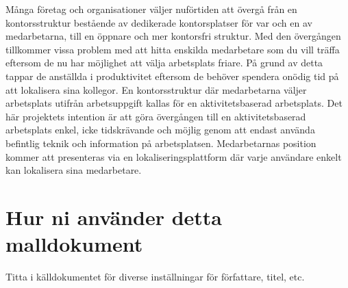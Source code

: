 \documentclass[swedish, a4paper,12pt]{article}
\begin{document}
\begin{sammanfattning}
%
%
Många företag och organisationer väljer nuförtiden att övergå från en kontorsstruktur bestående av dedikerade kontorsplatser för var och en av medarbetarna, till en öppnare och mer kontorsfri struktur. %
Med den övergången tillkommer vissa problem med att hitta enskilda medarbetare som du vill träffa eftersom de nu har möjlighet att välja arbetsplats friare. På grund av detta tappar de anställda i produktivitet eftersom de behöver spendera onödig tid på att lokalisera sina kollegor. En kontorsstruktur där medarbetarna väljer arbetsplats utifrån arbetsuppgift kallas för en aktivitetsbaserad arbetsplats. Det här projektets intention är att göra övergången till en aktivitetsbaserad arbetsplats enkel, icke tidskrävande och möjlig genom att endast använda befintlig teknik och information på arbetsplatsen. Medarbetarnas position kommer att presenteras via en lokaliseringsplattform där varje användare enkelt kan lokalisera sina medarbetare.
\end{sammanfattning}

\tableofcontents


\cleardoublepage


\mainmatter


\iffalse
\section*{Hur ni använder detta malldokument}
Titta i källdokumentet för diverse inställningar för författare, titel, etc.
\end{document}
